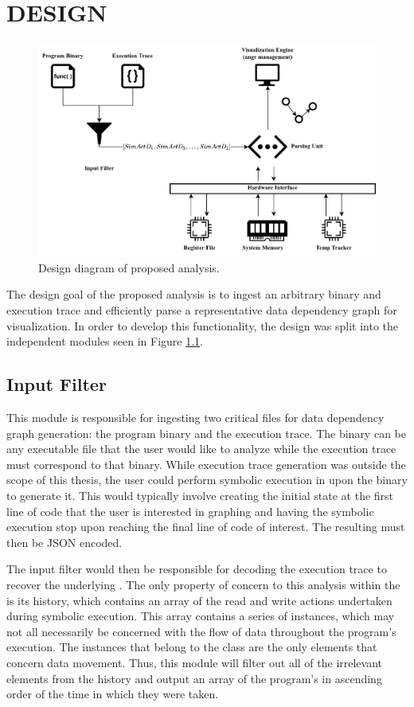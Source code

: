 \chapter{DESIGN}
\begin{figure}[ht]
    \centering
    \includegraphics[width=0.8\linewidth]{images/design.png}
    \caption[Design Diagram]{Design diagram of proposed analysis.}
    \label{fig:design}
\end{figure}

The design goal of the proposed analysis is to ingest an arbitrary binary and execution trace and efficiently parse a representative data dependency graph for visualization. In order to develop this functionality, the design was split into the independent modules seen in Figure \ref{fig:design}.

\section{Input Filter}
This module is responsible for ingesting two critical files for data dependency graph generation: the program binary and the execution trace. The binary can be any executable file that the user would like to analyze while the execution trace must correspond to that binary. While execution trace generation was outside the scope of this thesis, the user could perform symbolic execution in  upon the binary to generate it. This would typically involve creating the initial state at the first line of code that the user is interested in graphing and having the symbolic execution stop upon reaching the final line of code of interest. The resulting  must then be JSON encoded.

The input filter would then be responsible for decoding the execution trace to recover the underlying . The only property of concern to this analysis within the  is its history, which contains an array of the read and write actions undertaken during symbolic execution. This array contains a series of  instances, which may not all necessarily be concerned with the flow of data throughout the program's execution. The instances that belong to the  class are the only elements that concern data movement. Thus, this module will filter out all of the irrelevant elements from the history and output an array of the program's  in ascending order of the time in which they were taken.

